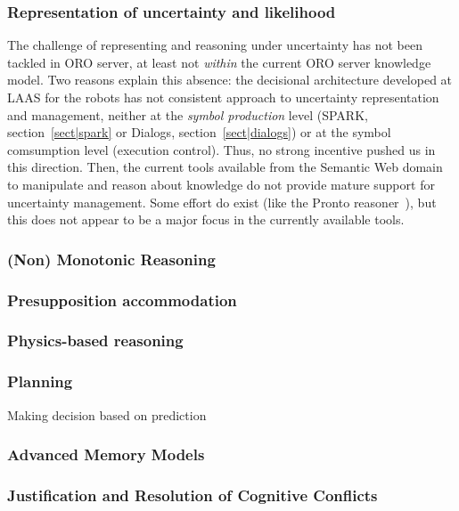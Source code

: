 \subsubsection{Representation of uncertainty and likelihood}

The challenge of representing and reasoning under uncertainty has not been
tackled in ORO server, at least not \emph{within} the current ORO server
knowledge model. Two reasons explain this absence: the decisional architecture
developed at LAAS for the robots has not consistent approach to uncertainty
representation and management, neither at the \emph{symbol production} level
(\ie SPARK, section~\ref{sect|spark} or {\sc Dialogs},
section~\ref{sect|dialogs}) or at the symbol comsumption level (execution
control). Thus, no strong incentive pushed us in this direction. Then, the
current tools available from the Semantic Web domain to manipulate and reason
about knowledge do not provide mature support for uncertainty management. Some
effort do exist (like the {\sc Pronto} reasoner~\cite{Klinov2008}), but this
does not appear to be a major focus in the currently available tools.


\subsubsection{(Non) Monotonic Reasoning}
\subsubsection{Presupposition accommodation}

\subsubsection{Physics-based reasoning}
\subsubsection{Planning}
Making decision based on prediction

\subsubsection{Advanced Memory Models}


\subsubsection{Justification and Resolution of Cognitive Conflicts}


